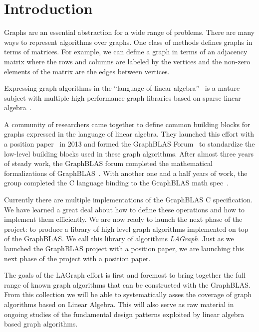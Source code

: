 \section{Introduction}
\label{sec:intro}



Graphs are an essential abstraction for a wide range of problems.  There are 
many ways to represent algorithms over graphs.  One class of methods defines
graphs in terms of matrices.  For example, we can define a graph in terms of an 
adjacency matrix where the rows and columns are labeled by the vertices and the
non-zero elements of the matrix are the edges between vertices.  

Expressing graph algorithms in the ``language of linear
algebra''~\cite{kepner2011graph} is a mature subject with multiple 
high performance graph libraries based on sparse 
linear algebra~\cite{combblas,
gadepally2015graphulo, gpi2016, sundaram2015graphmat,che2016programming}.  

A community of researchers came together to define common building
blocks for graphs expressed in the language of linear algebra.  They launched
this effort with a position paper~\cite{hpec13} in 2013 and formed the GraphBLAS
Forum~\cite{graphblas_web} to standardize the low-level building
blocks used in these graph algorithms.  After almost three years of steady work,
the GraphBLAS forum completed the
mathematical formalizations of GraphBLAS~\cite{mathgraphblas16}. With another 
one and a half years of work, the group completed the C
language binding to the GraphBLAS math spec~\cite{cspec}.

Currently there are multiple implementations of the GraphBLAS C specification.  
We have learned a great deal about how to define these operations and how to 
implement them efficiently.  We are now ready to launch the next phase of the project:
to produce a library of high level graph algorithms implemented on top of the GraphBLAS.
We call this library of algorithms \emph{LAGraph}.
Just as we launched the GraphBLAS project with a position paper, we are launching 
this next phase of the project with a position paper.  

The goals of the LAGraph effort is first and foremost to bring together the full 
range of known graph algorithms that can be constructed with the GraphBLAS.
From this collection we will be able to systematically asses the coverage of 
graph algorithms based on Linear Algebra. This will also serve
as raw material in ongoing studies of the fundamental design patterns exploited 
by linear algebra based graph algorithms. 

